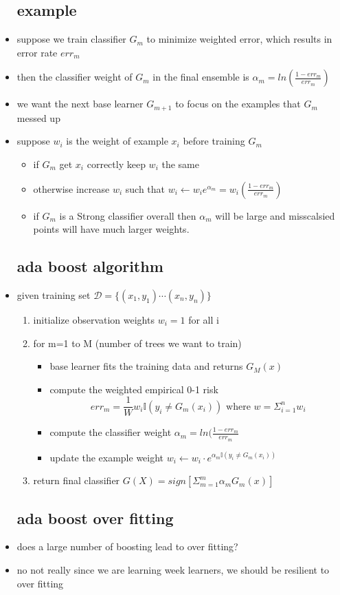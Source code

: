 \documentclass{article}
\begin{document}
\begin{itemize}
\subsection{example}
\item suppose we train classifier $G_m$ to minimize weighted error, which results in error rate $err_m$
\item then the classifier weight of $G_m$ in the final ensemble is $\alpha_m=ln(\frac{1-err_m}{err_m})$
\item we want the next base learner $G_{m+1}$ to focus on the examples that $G_m$ messed up 
\item suppose $w_i$ is the weight of example $x_i$ before training $G_m$
\begin{itemize}
    \item if $G_m$ get $x_i$ correctly keep $w_i$ the same
    \item otherwise increase $w_i$ such that $w_i\leftarrow w_ie^{\alpha_m}=w_i(\frac{1-err_m}{err_m})$
    \item if $G_m$ is a Strong classifier overall then $\alpha_m$ will be large and misscalsied points will have much larger weights. 
\end{itemize}
\subsection{ada boost algorithm}
\item given training set $\mathcal{D}=\{(x_1,y_1)\cdots (x_n,y_n)\}$
\begin{enumerate}
    \item initialize observation weights $w_i=1$ for all i 
    \item for m=1 to M (number of trees we want to train) 
    \begin{itemize}
        \item base learner fits the training data and returns $G_M(x)$
        \item compute the weighted empirical 0-1 risk $$err_{m}=\frac{1}{W}w_i\mathbb{I}(y_i\neq G_m(x_i)) \text{   where } w=\Sigma_{i=1}^{n}w_i$$
        \item compute the classifier weight $\alpha_m=ln(\frac{1-err_m}{err_m}$
        \item update the example weight $w_i\leftarrow w_i \cdot e^{\alpha_m \mathbb{I}(y_i\neq G_m(x_i))}$
    \end{itemize}
    \item return final classifier $G(X)=sign[\Sigma_{m=1}^{m}\alpha_m G_m(x)]$
\end{enumerate}
\subsection{ada boost over fitting}
\item does a large number of boosting lead to over fitting?
\item no not really since we are learning week learners, we should be resilient to over fitting 
 
\end{itemize}
\end{document}
